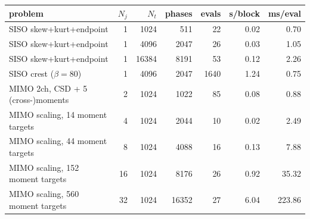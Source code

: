 \begin{tabular}{l r r r r r r}
problem & $N_j$ & $N_t$ & phases & evals & s/block & ms/eval \\
\hline
SISO skew+kurt+endpoint & 1 & 1024 & 511 & 22 & 0.02 & 0.70 \\
SISO skew+kurt+endpoint & 1 & 4096 & 2047 & 26 & 0.03 & 1.05 \\
SISO skew+kurt+endpoint & 1 & 16384 & 8191 & 53 & 0.12 & 2.26 \\
SISO crest ($\beta=80$) & 1 & 4096 & 2047 & 1640 & 1.24 & 0.75 \\
MIMO 2ch, CSD + 5 (cross-)moments & 2 & 1024 & 1022 & 85 & 0.08 & 0.88 \\
MIMO scaling, 14 moment targets & 4 & 1024 & 2044 & 10 & 0.02 & 2.49 \\
MIMO scaling, 44 moment targets & 8 & 1024 & 4088 & 16 & 0.13 & 7.88 \\
MIMO scaling, 152 moment targets & 16 & 1024 & 8176 & 26 & 0.92 & 35.32 \\
MIMO scaling, 560 moment targets & 32 & 1024 & 16352 & 27 & 6.04 & 223.86 \\
\end{tabular}
